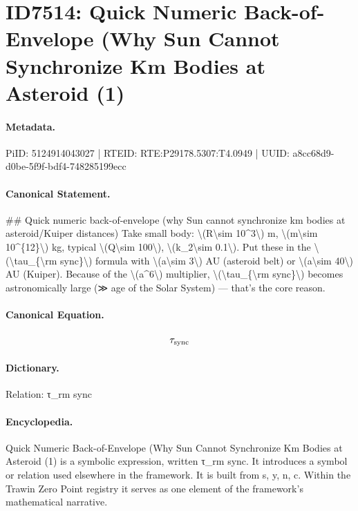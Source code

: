 \section*{ID7514: Quick Numeric Back-of-Envelope (Why Sun Cannot Synchronize Km Bodies at Asteroid (1)}
\paragraph{Metadata.}
PiID: 5124914043027 | RTEID: RTE:P29178.5307:T4.0949 | UUID: a8cc68d9-d0be-5f9f-bdf4-748285199ecc

\paragraph{Canonical Statement.}
\#\# Quick numeric back-of-envelope (why Sun cannot synchronize km bodies at asteroid/Kuiper distances) Take small body: \textbackslash{}(R\textbackslash{}sim 10\textasciicircum{}3\textbackslash{}) m, \textbackslash{}(m\textbackslash{}sim 10\textasciicircum{}\{12\}\textbackslash{}) kg, typical \textbackslash{}(Q\textbackslash{}sim 100\textbackslash{}), \textbackslash{}(k\_2\textbackslash{}sim 0.1\textbackslash{}). Put these in the \textbackslash{}(\textbackslash{}tau\_\{\textbackslash{}rm sync\}\textbackslash{}) formula with \textbackslash{}(a\textbackslash{}sim 3\textbackslash{}) AU (asteroid belt) or \textbackslash{}(a\textbackslash{}sim 40\textbackslash{}) AU (Kuiper). Because of the \textbackslash{}(a\textasciicircum{}6\textbackslash{}) multiplier, \textbackslash{}(\textbackslash{}tau\_\{\textbackslash{}rm sync\}\textbackslash{}) becomes astronomically large (≫ age of the Solar System) — that’s the core reason.

\paragraph{Canonical Equation.}
\[
\tau_{\rm sync}
\]

\paragraph{Dictionary.}
Relation: τ\_rm sync

\paragraph{Encyclopedia.}
Quick Numeric Back-of-Envelope (Why Sun Cannot Synchronize Km Bodies at Asteroid (1) is a symbolic expression, written τ\_rm sync. It introduces a symbol or relation used elsewhere in the framework. It is built from s, y, n, c. Within the Trawin Zero Point registry it serves as one element of the framework's mathematical narrative.
